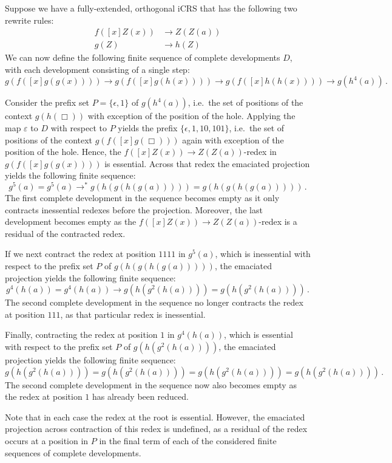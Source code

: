 \documentclass{LMCS}
\theoremstyle{definition}
\newcommand{\rew}{\rightarrow}
\newcommand{\rewt}{\rightarrow^*}
\newcommand{\pmap}{\varepsilon}
\begin{document}
\begin{exa}
Suppose we have a fully-extended, orthogonal iCRS that has the following two rewrite rules:
\begin{align*}
f([x]Z(x)) & \rew Z(Z(a)) \\
g(Z)       & \rew h(Z)
\end{align*}
We can now define the following finite sequence of complete developments $D$, with each development consisting of a single step:
\[
g(f([x]g(g(x)))) \rew g(f([x]g(h(x)))) \rew g(f([x]h(h(x)))) \rew g(h^4(a)) \, .
\]

Consider the prefix set $P = \{ \epsilon, 1 \}$ of $g(h^4(a))$, i.e.\ the set of positions of the context $g(h(\Box))$ with exception of the position of the hole. Applying the map $\pmap$ to $D$ with respect to $P$ yields the prefix $\{ \epsilon, 1, 10, 101 \}$, i.e.\ the set of positions of the context $g(f([x]g(\Box)))$ again with exception of the position of the hole. Hence, the $f([x]Z(x)) \rew Z(Z(a))$-redex in $g(f([x]g(g(x))))$ is essential. Across that redex the emaciated projection yields the following finite sequence:
\[
g^5(a) =  g^5(a) \rewt g(h(g(h(g(a))))) = g(h(g(h(g(a))))) \, .
\]
The first complete development in the sequence becomes empty as it only contracts inessential redexes before the projection. Moreover, the last development becomes empty as the $f([x]Z(x)) \rew Z(Z(a))$-redex is a residual of the contracted redex.

If we next contract the redex at position $1111$ in $g^5(a)$, which is inessential with respect to the prefix set $P$ of $g(h(g(h(g(a)))))$, the emaciated projection yields the following finite sequence:
\[
g^4(h(a)) = g^4(h(a)) \rew g(h(g^2(h(a)))) = g(h(g^2(h(a)))) \, .
\]
The second complete development in the sequence no longer contracts the redex at position $111$, as that particular redex is inessential. 

Finally, contracting the redex at position $1$ in $g^4(h(a))$, which is essential with respect to the prefix set $P$ of $g(h(g^2(h(a))))$, the emaciated projection yields the following finite sequence:
\[
g(h(g^2(h(a)))) = g(h(g^2(h(a)))) = g(h(g^2(h(a)))) = g(h(g^2(h(a)))) \, .
\]
The second complete development in the sequence now also becomes empty as the redex at position $1$ has already been reduced.

Note that in each case the redex at the root is essential. However, the emaciated projection across contraction of this redex is undefined, as a residual of the redex occurs at a position in $P$ in the final term of each of the considered finite sequences of complete developments.
\end{exa}
\end{document}
